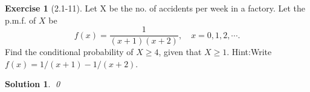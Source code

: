 \documentclass[14pt]{article}
\newtheorem*{solution}{Solution}
\theoremstyle{definition}
\newtheorem*{exercise}{Exercise}
\theoremstyle{remark}
\numberwithin{equation}{section}
\numberwithin{theorem}{section}
\begin{document}
\begin{exercise}[2.1-11]
    Let X be the no. of accidents per week in a factory. Let the p.m.f.
    of $X$ be
    $$
    f(x)=\frac{1}{(x+1)(x+2)},\quad x=0,1,2,\cdots.
    $$
    Find the conditional probability of $X\geq4$, given that $X\geq1$.
    Hint:Write $f(x)=1/(x+1)-1/(x+2)$.
\end{exercise}
\begin{solution}
    
    \qed
\end{solution}
\newpage


\nocite{*}
\end{document}

